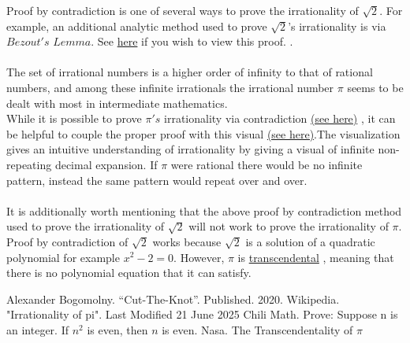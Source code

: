 \documentclass[12pt]{article}
\theoremstyle{plain}
\theoremstyle{definition}
\begin{document}
    Proof by contradiction is one of several ways to prove the irrationality of $\sqrt2$. For example, an additional analytic method used to prove $\sqrt2$'s irrationality is via $Bezout's$ $Lemma$. See \href{https://www.cut-the-knot.org/proofs/FloydSqRt.shtml}{here} if you wish to view this proof. 
    \cite{Alexander Bogomolny}. \\\\
    The set of irrational numbers is a higher order of infinity to that of rational numbers, and among these infinite irrationals the irrational number $\pi$ seems to be dealt with most in intermediate mathematics.\\
    While it is possible to prove $\pi's$ irrationality via contradiction \href{https://en.wikipedia.org/wiki/Proof_that_%CF%80_is_irrational}{(see here)} \cite{Wikipedia}, it can be helpful to couple the proper proof with this visual \href{https://www.youtube.com/watch?v=YsIlEVeHc4k}{(see here)}.The visualization gives an intuitive understanding of irrationality by giving a visual of infinite non-repeating decimal expansion. If $\pi$ were rational there would be no infinite pattern, instead the same pattern would repeat over and over.\\\\
    It is additionally worth mentioning that the above proof by contradiction method used to prove the irrationality of $\sqrt{2}$ will not work to prove the irrationality of $\pi$.\\
    Proof by contradiction of $\sqrt{2}$ works because $\sqrt{2}$ is a solution of a quadratic polynomial for example $x^2-2=0$. However, $\pi$ is \href{https://www.grc.nasa.gov/www/k-12/Numbers/Math/Mathematical_Thinking/transcendentality_of_p.htm}{transcendental} \cite{Nasa}, meaning that there is no polynomial equation that it can satisfy. 
    

\begin{thebibliography}{100}
         Alexander Bogomolny. ``Cut-The-Knot''. Published. 2020.
         Wikipedia. "Irrationality of pi". Last Modified 21 June 2025
         Chili Math. Prove: Suppose n is an integer. If $n^2$ is even, then $n$ is even. 
         Nasa. The Transcendentality of $\pi$
    \end{thebibliography}
\end{document}
